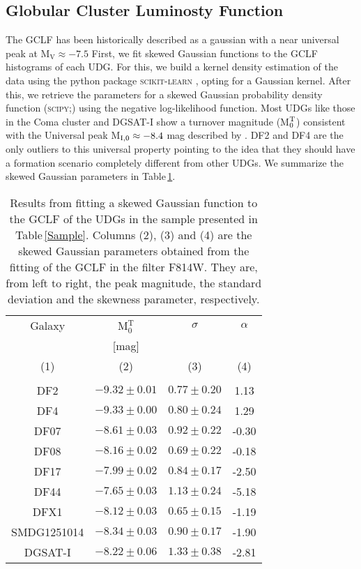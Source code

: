 \documentclass[baaa]{baaa}
\begin{document}
\subsection{Globular Cluster Luminosty Function}\label{subsec:gclf}
The GCLF has been historically described as a gaussian with a near universal peak at M$_{\textrm{V}}\approx -7.5$ \cite{harris_gclf}
First, we fit skewed Gaussian functions to the GCLF histograms of each UDG. For this, we build a kernel density estimation of the data using the python package \textsc{scikit-learn} \citep{scikit-learn}, opting for a Gaussian kernel. After this, we retrieve the parameters for a skewed Gaussian probability density function (\textsc{scipy};\citealt{2020SciPy-NMeth}) using the negative log-likelihood function.
Most UDGs like those in the Coma cluster and DGSAT-I show a turnover magnitude (M$_{\rm 0}^{\rm T}$) consistent with the Universal peak M$_{\rm I,0} \approx -8.4$ mag described by \cite{harris_gclf}. DF2 and DF4 are the only outliers to this universal property pointing to the idea that they should have a formation scenario completely different from other UDGs.
We summarize the skewed Gaussian parameters in Table\,\ref{tab:table2}. 
\begin{table}[]
    \caption{ Results from fitting a skewed Gaussian function to the GCLF of the UDGs in the sample presented in Table\,\ref{Sample}. Columns (2), (3) and (4) are the skewed Gaussian parameters obtained from the fitting of the GCLF in the filter F814W. They are, from left to right, the peak magnitude, the standard deviation and the skewness parameter, respectively.}
    \label{tab:table2}
    \centering
    \begin{tabular}{cccc}
    \hline \hline 
        Galaxy & M$_{\text{0}}^{\text{T}}$  & $\sigma$ & $\alpha$  \\ 
         & [mag]& & \\
        (1) & (2)& (3) &(4) \\\hline\\
        DF2 & $-9.32 \pm 0.01$ & $0.77 \pm 0.20$ & 1.13   \\ 
        DF4 & $-9.33 \pm 0.00$ & $0.80\pm 0.24 $ & 1.29   \\ 
        DF07        & $-8.61 \pm 0.03$ & $0.92 \pm 0.22$ & -0.30  \\ 
        DF08        & $-8.16 \pm 0.02$ & $0.69 \pm 0.22$ & -0.18  \\ 
        DF17        & $-7.99 \pm 0.02$ & $0.84 \pm 0.17$ & -2.50  \\ 
        DF44        & $-7.65 \pm 0.03$ & $1.13 \pm 0.24$ & -5.18  \\ 
        DFX1        & $-8.12 \pm 0.03$ & $0.65 \pm 0.15$ & -1.19  \\ 
        SMDG1251014 & $-8.34 \pm 0.03$ & $0.90 \pm 0.17$ & -1.90  \\ 
        DGSAT-I     & $-8.22 \pm 0.06$ & $1.33 \pm 0.38$ & -2.81  \\ \hline
    \end{tabular}

\end{table}
\end{document}
